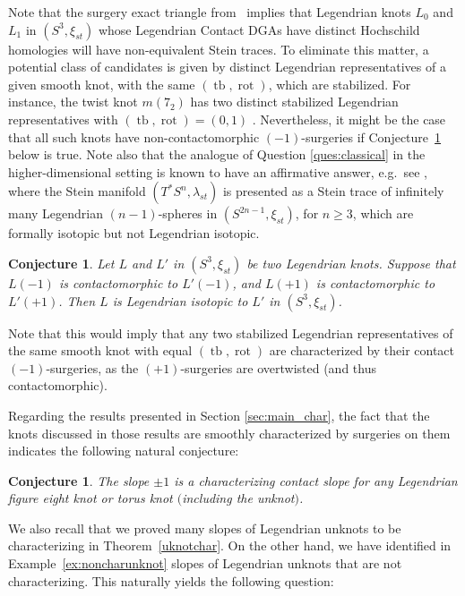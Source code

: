 \documentclass[11pt]{amsart} %
\DeclareMathOperator{\tb}{tb}
\DeclareMathOperator{\rot}{rot}
\theoremstyle{plain}
\newtheorem{con}[Theorem]{Conjecture}
\theoremstyle{definition}
\begin{document}
Note that the surgery exact triangle from~\cite{BourgeoisEkholmEliashberg12} implies that Legendrian knots $L_0$ and $L_1$ in $(S^3,\xi_{st})$ whose Legendrian Contact DGAs have distinct Hochschild homologies will have non-equivalent Stein traces. To eliminate this matter, a potential class of candidates is given by distinct Legendrian representatives of a given smooth knot, with the same $(\tb,\rot)$, which are stabilized. For instance, the twist knot $m(7_2)$ has two distinct stabilized Legendrian representatives with $(\tb,\rot)=(0,1)$ \cite[Theorem 1.1]{EtnyreNgVertesi13}. Nevertheless, it might be the case that all such knots have non-contactomorphic $(-1)$-surgeries if Conjecture~\ref{con:+and-} below is true. Note also that the analogue of Question \ref{ques:classical} in the higher-dimensional setting is known to have an affirmative answer, e.g.~see \cite[Corollary 1.22]{Lazarev19}, where the Stein manifold $(T^*S^n,\lambda_{st})$ is presented as a Stein trace of infinitely many Legendrian $(n-1)$-spheres in $(S^{2n-1},\xi_{st})$, for $n\geq3$, which are formally isotopic but not Legendrian isotopic.

\begin{con} \label{con:+and-}
	Let $L$ and $L'$ in $(S^3,\xi_{st})$ be two Legendrian knots. Suppose that $L(-1)$ is contactomorphic to $L'(-1)$, and $L(+1)$ is contactomorphic to $L'(+1)$. Then $L$ is Legendrian isotopic to $L'$ in $(S^3,\xi_{st})$.
\end{con}

Note that this would imply that any two stabilized Legendrian representatives of the same smooth knot with equal $(\tb,\rot)$ are characterized by their contact $(-1)$-surgeries, as the $(+1)$-surgeries are overtwisted (and thus contactomorphic).

Regarding the results presented in Section \ref{sec:main_char}, the fact that the knots discussed in those results are smoothly characterized by surgeries on them~\cite{KronheimerMrowkaOzsvathSzabo07, OzsvathSzabo19} indicates the following natural conjecture:

\begin{con}\label{con:torus}
	The slope $\pm1$ is a characterizing contact slope for any Legendrian figure eight knot or torus knot $($including the unknot$)$.
\end{con}

We also recall that we proved many slopes of Legendrian unknots to be characterizing in Theorem~\ref{uknotchar}. On the other hand, we have identified in Example~\ref{ex:noncharunknot} slopes of Legendrian unknots that are not characterizing. This naturally yields the following question:
\end{document}

